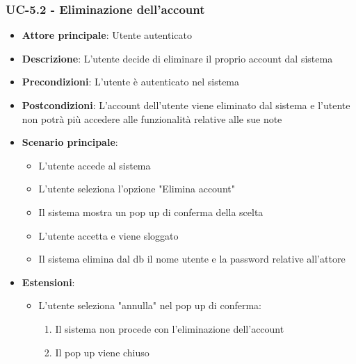 \documentclass[11pt,a4paper]{article}
\begin{document}
\subsubsection{UC-5.2 - Eliminazione dell'account}
\begin{itemize}
    \item \textbf{Attore principale}: Utente autenticato
    \item \textbf{Descrizione}: L'utente decide di eliminare il proprio account dal sistema
    \item \textbf{Precondizioni}: L'utente è autenticato nel sistema
    \item \textbf{Postcondizioni}: L'account dell'utente viene eliminato dal sistema e l'utente non potrà più accedere alle funzionalità relative alle sue note
    \item \textbf{Scenario principale}:
        \begin{itemize}
            \item L'utente accede al sistema
            \item L'utente seleziona l'opzione "Elimina account"
            \item Il sistema mostra un pop up di conferma della scelta
            \item L'utente accetta e viene sloggato
            \item Il sistema elimina dal db il nome utente e la password relative all'attore
        \end{itemize}
    \item \textbf{Estensioni}:
        \begin{itemize}
            \item L'utente seleziona "annulla" nel pop up di conferma:
                \begin{enumerate}
                    \item Il sistema non procede con l'eliminazione dell'account
                    \item Il pop up viene chiuso
                \end{enumerate}
        \end{itemize}
\end{itemize}
\end{document}
